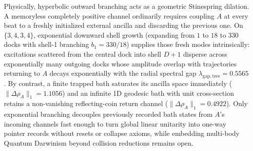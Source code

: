 Physically, hyperbolic outward branching acts as a geometric Stinespring dilation. A memoryless completely positive
channel ordinarily requires coupling $A$ at every beat to a freshly initialized external ancilla and discarding the
previous one. On $\{3,4,3,4\}$, exponential downward shell growth (expanding from $1$ to $18$ to $330$ docks with
shell-1 branching $b_1 = 330/18$) supplies those fresh modes intrinsically: excitations scattered from the central dock
into shell $D + 1$ disperse across exponentially many outgoing docks whose amplitude overlap with trajectories returning
to $A$ decays exponentially with the radial spectral gap $\lambda_{\mathrm{gap,tree}} = 0.5565$. By contrast, a finite
trapped bath saturates its ancilla space immediately ($\|\Delta\rho_A\|_1 = 1.1056$) and an infinite 1D geodesic bath
with unit cross-section retains a non-vanishing reflecting-coin return channel ($\|\Delta\rho_A\|_1 = 0.4922$). Only
exponential branching decouples previously recorded bath states from $A$'s incoming channels fast enough to turn global
linear unitarity into one-way pointer records without resets or collapse axioms, while embedding multi-body Quantum
Darwinism beyond collision reductions remains open.
